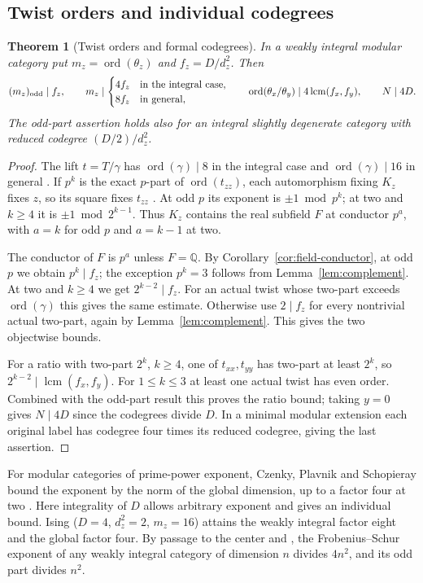 \documentclass[11pt,a4paper]{article}
\numberwithin{equation}{section}
\newtheorem{theorem}{Theorem}[section]
\theoremstyle{remark}
\newcommand{\QQ}{\mathbb Q}
\newcommand{\lcm}{\operatorname{lcm}}
\DeclareMathOperator{\ord}{ord}
\begin{document}
\subsection{Twist orders and individual codegrees}\label{fam:M:sec:3.2}
\begin{theorem}[Twist orders and formal codegrees]\label{fam:M:3.5}\label{thm:twistdiv}
In a weakly integral modular category put $m_z=\ord(\theta_z)$ and $f_z=D/d_z^2$. Then
\[
 (m_z)_{\rm odd}\mid f_z,\qquad
 m_z\mid \begin{cases}4f_z&\text{in the integral case},\\8f_z&\text{in general},\end{cases}
 \qquad \ord(\theta_x/\theta_y)\mid4\lcm(f_x,f_y),\qquad N\mid4D.
\]
The odd-part assertion holds also for an integral slightly degenerate category with reduced codegree $(D/2)/d_z^2$.
\end{theorem}
\begin{proof}
The lift $t=T/\gamma$ has $\ord(\gamma)\mid8$ in the integral case and $\ord(\gamma)\mid16$ in general \cite[Proposition~6.7 and Theorem~6.10]{DLNCongruence}. If $p^k$ is the exact $p$-part of $\ord(t_{zz})$, each automorphism fixing $K_z$ fixes $z$, so its square fixes $t_{zz}$ \cite[Theorem~II]{DLNCongruence}. At odd $p$ its exponent is $\pm1\bmod p^k$; at two and $k\ge4$ it is $\pm1\bmod 2^{k-1}$. Thus $K_z$ contains the real subfield $F$ at conductor $p^a$, with $a=k$ for odd $p$ and $a=k-1$ at two.

The conductor of $F$ is $p^a$ unless $F=\QQ$. By
Corollary~\ref{cor:field-conductor}, at odd $p$ we obtain
$p^k\mid f_z$; the exception $p^k=3$ follows from
Lemma~\ref{lem:complement}. At two and $k\ge4$ we get
$2^{k-2}\mid f_z$. For an actual twist whose two-part exceeds
$\ord(\gamma)$ this gives the same estimate. Otherwise use
$2\mid f_z$ for every nontrivial actual two-part, again by
Lemma~\ref{lem:complement}. This gives the two objectwise bounds.

For a ratio with two-part $2^k$, $k\ge4$, one of $t_{xx},t_{yy}$ has two-part at least $2^k$, so $2^{k-2}\mid\lcm(f_x,f_y)$. For $1\le k\le3$ at least one actual twist has even order. Combined with the odd-part result this proves the ratio bound; taking $y=0$ gives $N\mid4D$ since the codegrees divide $D$. In a minimal modular extension each original label has codegree four times its reduced codegree, giving the last assertion.
\end{proof}
For modular categories of prime-power exponent, Czenky, Plavnik and Schopieray bound the exponent by the norm of the global dimension, up to a factor four at two \cite[main theorem, p.~2]{CPSexponent}. Here integrality of $D$ allows arbitrary exponent and gives an individual bound. Ising ($D=4$, $d_z^2=2$, $m_z=16$) attains the weakly integral factor eight and the global factor four. By passage to the center and \cite[Theorem~5.5]{NSfs}, the Frobenius--Schur exponent of any weakly integral category of dimension $n$ divides $4n^2$, and its odd part divides $n^2$.
\end{document}
